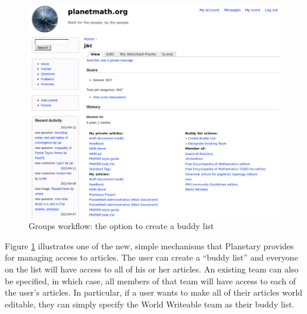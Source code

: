 \begin{vplace}[0.7]
\begin{figure}[h]
\begin{center}
\includegraphics[width=.85\textwidth]{./inputs/BuddyListToCreate.png}
\end{center}
\caption{Groups workflow: the option to create a buddy list \label{BuddyListToCreate}}
\end{figure}
\bigskip

Figure \ref{BuddyListToCreate} illustrates one of the new, simple
mechanisms that Planetary provides for managing access to articles.
The user can create a ``buddy list'' and everyone on the list will
have access to all of his or her articles.  An existing team can also
be specified, in which case, all members of that team will have access
to each of the user's articles.  In particular, if a user wants to
make all of their articles world editable, they can simply specify the
World Writeable team as their buddy list.
\end{vplace}

\newpage
\FloatBarrier

